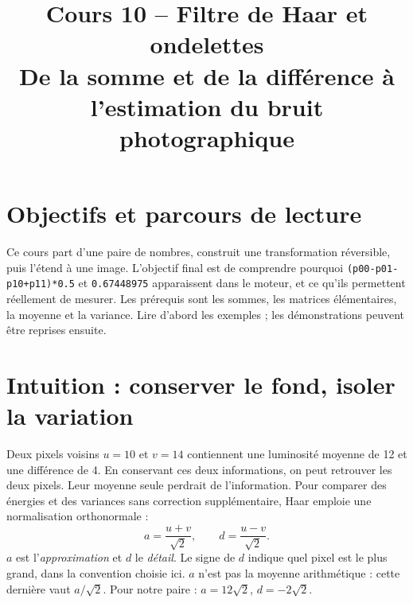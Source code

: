 
\setcounter{tocdepth}{1}
\title{Cours 10 -- Filtre de Haar et ondelettes\\
De la somme et de la différence à l'estimation du bruit photographique}


\section{Objectifs et parcours de lecture}
Ce cours part d'une paire de nombres, construit une transformation réversible,
puis l'étend à une image. L'objectif final est de comprendre pourquoi
\texttt{(p00-p01-p10+p11)*0.5} et \texttt{0.67448975} apparaissent dans
le moteur, et ce qu'ils permettent réellement de mesurer.
Les prérequis sont les sommes, les matrices élémentaires, la moyenne et la variance.
Lire d'abord les exemples ; les démonstrations peuvent être reprises ensuite.


\section{Intuition : conserver le fond, isoler la variation}
Deux pixels voisins $u=10$ et $v=14$ contiennent une luminosité moyenne
de 12 et une différence de 4. En conservant ces deux informations, on peut
retrouver les deux pixels. Leur moyenne seule perdrait de l'information.
Pour comparer des énergies et des variances sans correction supplémentaire,
Haar emploie une normalisation orthonormale :
\begin{equation}\label{eq:pair}
a=\frac{u+v}{\sqrt{2}},\qquad d=\frac{u-v}{\sqrt{2}}.
\end{equation}
$a$ est l'\emph{approximation} et $d$ le \emph{détail}. Le signe de $d$
indique quel pixel est le plus grand, dans la convention choisie ici.
$a$ n'est pas la moyenne arithmétique : cette dernière vaut $a/\sqrt{2}$.
Pour notre paire : $a=12\sqrt{2}$, $d=-2\sqrt{2}$.

